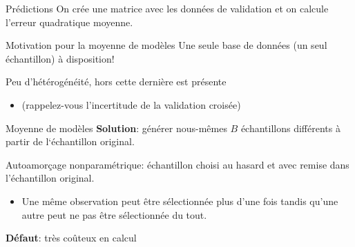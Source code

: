 \documentclass[
  ignorenonframetext,
]{beamer}
\newenvironment{Shaded}{\begin{snugshade}}{\end{snugshade}}
\newcommand{\AttributeTok}[1]{\textcolor[rgb]{0.40,0.45,0.13}{#1}}
\newcommand{\CommentTok}[1]{\textcolor[rgb]{0.37,0.37,0.37}{#1}}
\newcommand{\DecValTok}[1]{\textcolor[rgb]{0.68,0.00,0.00}{#1}}
\newcommand{\FunctionTok}[1]{\textcolor[rgb]{0.28,0.35,0.67}{#1}}
\newcommand{\NormalTok}[1]{\textcolor[rgb]{0.00,0.23,0.31}{#1}}
\newcommand{\OtherTok}[1]{\textcolor[rgb]{0.00,0.23,0.31}{#1}}
\newcommand{\SpecialCharTok}[1]{\textcolor[rgb]{0.37,0.37,0.37}{#1}}
\providecommand{\tightlist}{%
  \setlength{\itemsep}{0pt}\setlength{\parskip}{0pt}}\usepackage{longtable,booktabs,array}
\begin{document}
\begin{frame}[fragile]{Prédictions}
\protect\hypertarget{pruxe9dictions}{}
On crée une matrice avec les données de validation et on calcule
l'erreur quadratique moyenne.

\footnotesize

\begin{Shaded}
\end{Shaded}

\normalsize
\end{frame}

\begin{frame}{Motivation pour la moyenne de modèles}
\protect\hypertarget{motivation-pour-la-moyenne-de-moduxe8les}{}
Une seule base de données (un seul échantillon) à disposition!

Peu d'hétérogénéité, hors cette dernière est présente

\begin{itemize}
\tightlist
\item
  (rappelez-vous l'incertitude de la validation croisée)
\end{itemize}
\end{frame}

\begin{frame}{Moyenne de modèles}
\protect\hypertarget{moyenne-de-moduxe8les}{}
\textbf{Solution}: générer nous-mêmes \(B\) échantillons différents à
partir de l`échantillon original.

Autoamorçage nonparamétrique: échantillon choisi au hasard et avec
remise dans l'échantillon original.

\begin{itemize}
\tightlist
\item
  Une même observation peut être sélectionnée plus d'une fois tandis
  qu'une autre peut ne pas être sélectionnée du tout.
\end{itemize}

\textbf{Défaut}: très coûteux en calcul
\end{frame}
\end{document}

